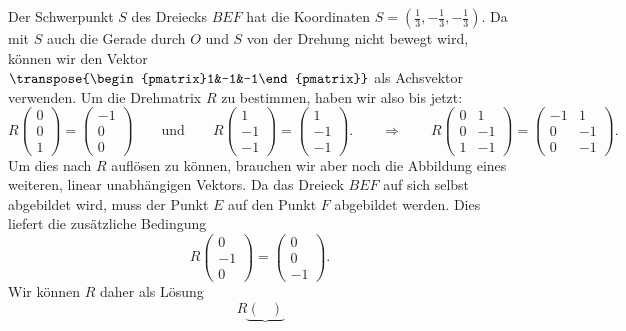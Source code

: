 \begin{loesung}
\begin{teilaufgaben}
\item
Der Schwerpunkt $S$ des Dreiecks $BEF$ hat die Koordinaten
$S=(\frac13,-\frac13,-\frac13)$.
Da mit $S$ auch die Gerade durch $O$ und $S$ von der Drehung nicht bewegt
wird, können wir den Vektor $\transpose{\begin{pmatrix}1&-1&-1\end{pmatrix}}$ als
Achsvektor verwenden.
Um die Drehmatrix $R$ zu bestimmen, haben wir also bis jetzt:
\[
R
\begin{pmatrix}0\\0\\1\end{pmatrix}
=
\begin{pmatrix}-1\\0\\0\end{pmatrix}
\qquad\text{und}\qquad
R
\begin{pmatrix}1\\-1\\-1\end{pmatrix}
=
\begin{pmatrix}1\\-1\\-1\end{pmatrix}.
\qquad\Rightarrow\qquad
R
\begin{pmatrix}
0& 1\\
0&-1\\
1&-1
\end{pmatrix}
=
\begin{pmatrix}
-1& 1\\
 0&-1\\
 0&-1
\end{pmatrix}.
\]
Um dies nach $R$ auflösen zu können, brauchen wir aber noch die Abbildung
eines weiteren, linear unabhängigen Vektors.
Da das Dreieck $BEF$ auf sich selbst abgebildet wird, muss der Punkt
$E$ auf den Punkt $F$ abgebildet werden.
Dies liefert die zusätzliche Bedingung
\[
R
\begin{pmatrix}0\\-1\\0\end{pmatrix}
=
\begin{pmatrix}0\\0\\-1\end{pmatrix}.
\]
Wir können $R$ daher als Lösung
\[
R
\underbrace{
\begin{pmatrix}

\end{pmatrix}}\]
\end{teilaufgaben}
\end{loesung}
